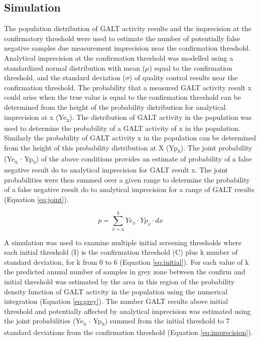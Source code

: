 \documentclass[review]{elsarticle}
\begin{document}
\subsection*{Simulation}
\label{sec:orgdc2b861}
The population distribution of GALT activity results and the
imprecision at the confirmatory threshold were used to estimate the
number of potentially false negative samples due measurement
imprecision near the confirmation threshold. Analytical imprecision at
the confirmation threshold was modelled using a standardized normal
distribution with mean (\(\mu\)) equal to the confirmation threshold, and
the standard deviation (\(\sigma\)) of quality control results near the
confirmation threshold. The probability that a measured GALT activity
result x could arise when the true value is equal to the confirmation
threshold can be determined from the height of the probability
distribution for analytical imprecision at x (Ye\textsubscript{x}). The distribution
of GALT activity in the population was used to determine the
probability of a GALT activity of x in the population. Similarly the
probability of GALT activity x in the population can be determined
from the height of this probability distribution at X (Yp\textsubscript{x}). The
joint probability (Ye\textsubscript{x} \(\cdot\) Yp\textsubscript{x}) of the above conditions provides
an estimate of probability of a false negative result do to analytical
imprecision for GALT result x. The joint probabilities were then
summed over a given range to determine the probability of a false
negative result do to analytical imprecision for a range of GALT
results (Equation \ref{eq:joint}).


\begin{equation}\label{eq:joint}
p = \sum_{x=a}^b Ye_x \cdot Yp_x \cdot dx
\end{equation}

A simulation was used to examine multiple initial screening thresholds
where each initial threshold (I) is the confirmation threshold (C)
plus k number of standard deviation, for k from 0 to 6 (Equation
\ref{eq:initial}). For each value of k the predicted annual number of
samples in grey zone between the confirm and initial threshold was
estimated by the area in this region of the probability density
function of GALT activity in the population using the numerical
integration (Equation \ref{eq:grey}). The number GALT results above
initial threshold and potentially affected by analytical imprecision
was estimated using the joint probabilities (Ye\textsubscript{x} \(\cdot\) Yp\textsubscript{x}) summed from
the initial threshold to 7 standard deviations from the confirmation
threshold (Equation \ref{eq:imprecision}).
\end{document}
